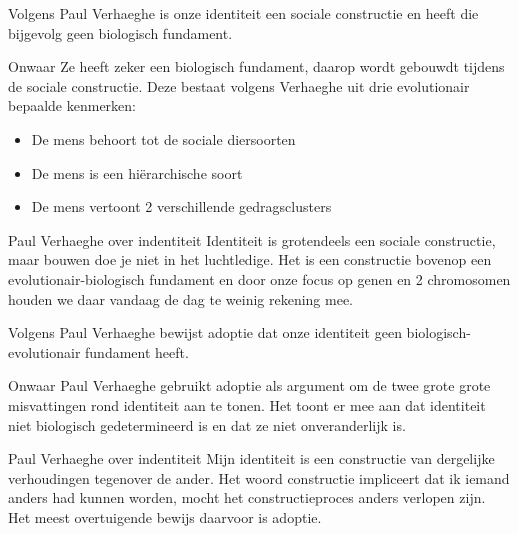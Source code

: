 \documentclass[main.tex]{subfiles}
\begin{document}
\begin{examenvraag}
    \begin{stelling}
        Volgens Paul Verhaeghe is onze identiteit een sociale constructie en heeft die bijgevolg geen biologisch fundament.
    \end{stelling}

    \begin{stelling-antwoord}{Onwaar}
        Ze heeft zeker een biologisch fundament, daarop wordt gebouwdt tijdens de sociale constructie. Deze bestaat volgens Verhaeghe uit drie evolutionair bepaalde kenmerken:
        \begin{itemize}
        \item De mens behoort tot de sociale diersoorten
        \item De mens is een hiërarchische soort
        \item De mens vertoont 2 verschillende gedragsclusters
        \end{itemize}
        \begin{citaat}{Paul Verhaeghe over indentiteit}
            Identiteit is grotendeels een sociale constructie, maar bouwen doe je niet in het luchtledige.
            Het is een constructie bovenop een evolutionair-biologisch fundament en door onze focus op genen en 2 chromosomen houden we daar vandaag de dag te weinig rekening mee.
        \end{citaat}
    \end{stelling-antwoord}
\end{examenvraag}


\begin{examenvraag}
    \begin{stelling}
        Volgens Paul Verhaeghe bewijst adoptie dat onze identiteit geen biologisch-evolutionair fundament heeft.
    \end{stelling}

    \begin{stelling-antwoord}{Onwaar}
        Paul Verhaeghe gebruikt adoptie als argument om de twee grote grote misvattingen rond identiteit aan te tonen. Het toont er mee aan dat identiteit niet biologisch gedetermineerd is en dat ze niet onveranderlijk is.
        \begin{citaat}{Paul Verhaeghe over indentiteit}
            Mijn identiteit is een constructie van dergelijke verhoudingen tegenover de ander.
            Het woord constructie impliceert dat ik iemand anders had kunnen worden, mocht het constructieproces anders verlopen zijn.
            Het meest overtuigende bewijs daarvoor is adoptie.
        \end{citaat}
    \end{stelling-antwoord}
\end{examenvraag}
\end{document}
